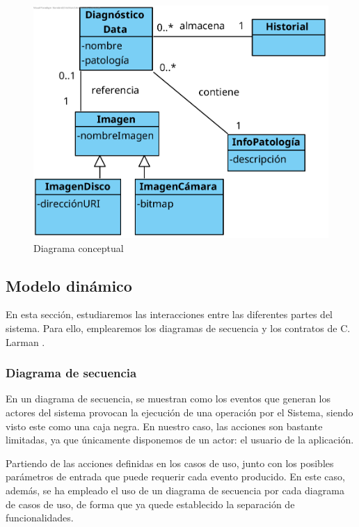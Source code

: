 \begin{figure}[H]
	\centering
	\includegraphics[scale = 1.2]{imagenes/MapaConceptual.png}
	\caption{Diagrama conceptual}
	\label{fig:conceptual}
\end{figure}

\subsection{Modelo dinámico}

En esta sección, estudiaremos las interacciones entre las diferentes partes del sistema. Para ello, emplearemos los diagramas de secuencia y los contratos de C. Larman \cite{larman2003uml}.

\subsubsection{Diagrama de secuencia}
En un diagrama de secuencia, se muestran como los eventos que generan los actores del sistema provocan la ejecución de una operación por el Sistema, siendo visto este como una caja negra. En nuestro caso, las acciones son bastante limitadas, ya que únicamente disponemos de un actor: el usuario de la aplicación. 

Partiendo de las acciones definidas en los casos de uso, junto con los posibles parámetros de entrada que puede requerir cada evento producido. En este caso, además, se ha empleado el uso de un diagrama de secuencia por cada diagrama de casos de uso, de forma que ya quede establecido la separación de funcionalidades.

